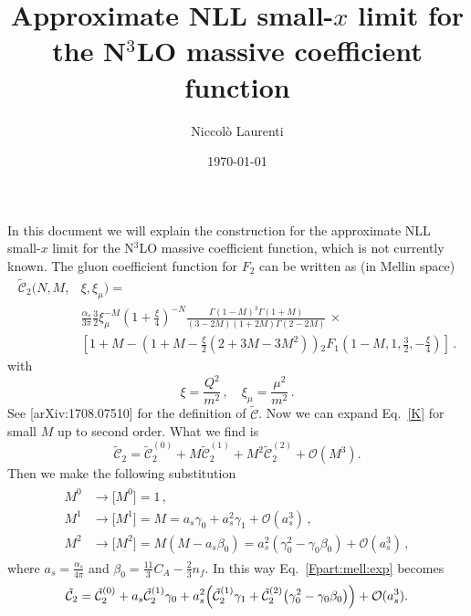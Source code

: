 \documentclass[a4paper]{article}
\title{Approximate NLL small-$x$ limit for the N$^3$LO massive coefficient function}
\author{Niccolò Laurenti}
\date{\today}
\newcommand{\C}[0]{\tilde{\mathcal{C}}}
\begin{document}
	\maketitle
	In this document we will explain the construction for the approximate NLL small-$x$ limit for the N$^3$LO massive coefficient function, which is not currently known.
	The gluon coefficient function for $F_2$ can be written as (in Mellin space)
	\begin{equation}
		\label{K}
		\begin{split}
		\tilde{\mathcal{C}}_{2}(N, M,& \xi, \xi_\mu) = \\
		&\frac{\alpha_s}{3 \pi} \frac{3}{2} \xi_\mu^{-M} \left(1+\frac{\xi}{4}\right)^{-N} \frac{\Gamma(1-M)^3 \Gamma(1+M)}{(3-2M)(1+2M)\Gamma(2-2M)}\, \times \\
		& \left[1+M - \left( 1 + M - \frac{\xi}{2}(2+3M - 3M^2) \right){}_2F_1\left(1-M,1,\frac{3}{2}, -\frac{\xi}{4}\right)\right]\,.
		\end{split}
	\end{equation}
	with
	\begin{equation}
		\xi = \frac{Q^2}{m^2}\,, \quad \xi_\mu = \frac{\mu^2}{m^2}\,.
	\end{equation}
See [arXiv:1708.07510] for the definition of $\tilde{\mathcal{C}}$.
Now we can expand Eq.~\eqref{K} for small $M$ up to second order. What we find is
\begin{equation}\label{Fpart:mell:exp}
	\C_2 = \C_2^{(0)}+ M \C_2^{(1)}+ M^2 \C_2^{(2)}+\mathcal{O}(M^3).
\end{equation}
Then we make the following substitution
\begin{align}
	\begin{split}
	M^0 & \rightarrow \bigl[M^0\bigr] =1 \,,\\
	M^1 & \rightarrow \bigl[M^1\bigr] =M= a_s \gamma_0 +a_s^2 \gamma_1 +\mathcal{O}(a_s^3) \,,\\
	M^2 & \rightarrow \bigl[M^2\bigr]=M(M-a_s\beta_0) = a_s^2(\gamma^2_0- \gamma_0\beta_0) +\mathcal{O}(a_s^3) \,,
	\end{split}
\end{align}
where $a_s = \frac{\alpha_s}{4\pi}$ and $\beta_0 = \frac{11}{3} C_A - \frac{2}{3} n_f$.
In this way Eq.~\eqref{Fpart:mell:exp} becomes
\begin{equation}\label{Fpart:exp2}
	\C_2=\C_2^{(0)} + a_s \C_2^{(1)} \gamma_0+ a_s^2\Bigl(\C_2^{(1)} \gamma_1 + \C_2^{(2)}\bigl(\gamma_0^2-\gamma_0\beta_0\bigr)\Bigr)+\mathcal{O}(a_s^3).
\end{equation}
\end{document}
